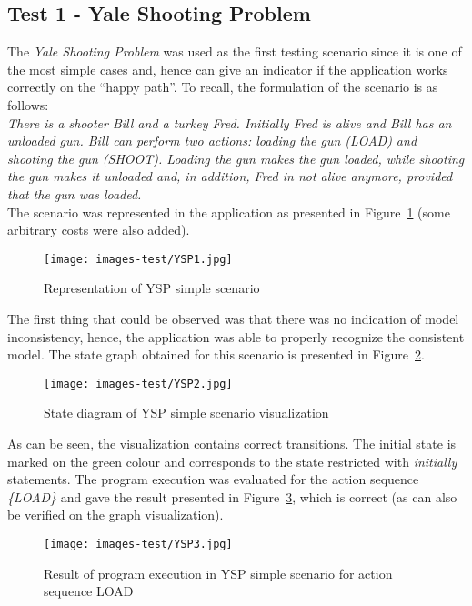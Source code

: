 \documentclass[a4paper]{article}
\begin{document}
\subsection{Test 1 - Yale Shooting Problem}
%
The \textit{Yale Shooting Problem} was used as the first testing scenario since it is one of the most simple cases and, hence can give an indicator if the application works correctly on the ``happy path''. To recall, the formulation of the scenario is as follows: \\[0.5\baselineskip]
\textit{There is a shooter Bill and a turkey Fred. Initially Fred is alive and Bill has an unloaded gun. Bill can perform two actions: loading the gun (LOAD) and shooting the gun (SHOOT). Loading the gun makes the gun loaded, while shooting the gun makes it unloaded and, in addition, Fred in not alive anymore, provided that the gun was loaded.} \\[0.5\baselineskip]
The scenario was represented in the application as presented in Figure~\ref{fig:ysp1} (some arbitrary costs were also added).
\begin{figure}[htp]
    \centering
    \texttt{[image: images-test/YSP1.jpg]}
    \caption{Representation of YSP simple scenario}
    \label{fig:ysp1}
\end{figure}
The first thing that could be observed was that there was no indication of model inconsistency, hence, the application was able to properly recognize the consistent model. The state graph obtained for this scenario is presented in Figure~\ref{fig:ysp2}.
\begin{figure}[htp]
    \centering
    \texttt{[image: images-test/YSP2.jpg]}
    \caption{State diagram of YSP simple scenario visualization}
    \label{fig:ysp2}
\end{figure}
As can be seen, the visualization contains correct transitions. The initial state is marked on the green colour and corresponds to the state restricted with \textit{initially} statements. The program execution was evaluated for the action sequence \textit{\{LOAD\}} and gave the result presented in Figure~\ref{fig:ysp3}, which is correct (as can also be verified on the graph visualization).
\begin{figure}[htp]
    \centering
    \texttt{[image: images-test/YSP3.jpg]}
    \caption{Result of program execution in YSP simple scenario for action sequence LOAD}
    \label{fig:ysp3}
\end{figure}

\end{document}

